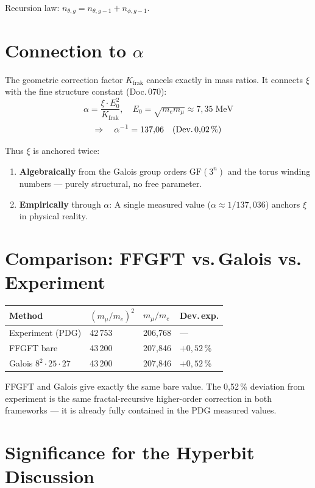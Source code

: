 Recursion law: $n_{\theta,g} = n_{\theta,g-1} + n_{\phi,g-1}$.

\section{Connection to \texorpdfstring{$\alpha$}{alpha}}

The geometric correction factor $K_\mathrm{frak}$ cancels exactly in
mass ratios. It connects $\xi$ with the
fine structure constant (Doc.\,070):
\[
  \alpha = \frac{\xi \cdot E_0^2}{K_\mathrm{frak}}, \quad
  E_0 = \sqrt{m_e m_\mu} \approx 7{,}35\;\text{MeV}
\]
\[
  \Rightarrow\quad \alpha^{-1} = 137{,}06 \quad (\text{Dev.\,0{,}02\,\%})
\]

Thus $\xi$ is anchored twice:
\begin{enumerate}
  \item \textbf{Algebraically} from the Galois group orders $\mathrm{GF}(3^n)$
    and the torus winding numbers --- purely structural, no free parameter.
  \item \textbf{Empirically} through $\alpha$: A single measured value
    ($\alpha \approx 1/137{,}036$) anchors $\xi$ in physical reality.
\end{enumerate}

\section{Comparison: FFGFT vs.\,Galois vs.\,Experiment}

\begin{center}
\begingroup\small
\begin{tabular}{@{}p{3.5cm}p{1.5cm}p{1.8cm}p{1.8cm}@{}}
\toprule
Method & $(m_\mu/m_e)^2$ & $m_\mu/m_e$ & Dev.\,exp. \\
\midrule
Experiment (PDG) & 42\,753 & 206{,}768 & --- \\
FFGFT bare & 43\,200 & 207{,}846 & $+0{,}52$\,\% \\
Galois $8^2\cdot25\cdot27$ & 43\,200 & 207{,}846 & $+0{,}52$\,\% \\
\bottomrule
\end{tabular}
\endgroup
\end{center}

FFGFT and Galois give exactly the same bare value. The 0{,}52\,\%
deviation from experiment is the same fractal-recursive
higher-order correction in both frameworks --- it is already fully contained in the
PDG measured values.

\section{Significance for the Hyperbit Discussion}

